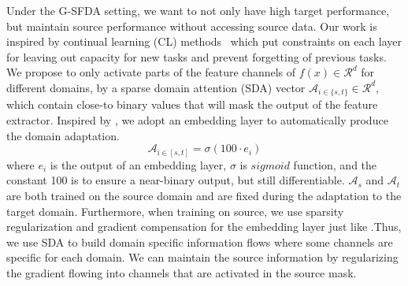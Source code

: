 \documentclass[10pt,twocolumn,letterpaper]{article}
\begin{document}
Under the G-SFDA setting, we want to not only have high target performance, but maintain source performance without accessing source data.  Our work is inspired by continual learning (CL) methods~\cite{abati2020conditional,mallya2018packnet,serra2018overcoming} which put constraints on each layer for leaving out capacity for new tasks and prevent forgetting of previous tasks.
We propose to only activate parts of the feature channels of $f(x)\in \mathcal{R}^d$ for different domains, by a sparse domain attention (SDA) vector $\mathcal{A}_{i\in\{s,t\}} \in \mathcal{R}^d$, which contain close-to binary values that will mask the output of the feature extractor. Inspired by \cite{serra2018overcoming}, we adopt an embedding layer to automatically produce the domain adaptation.
\begin{equation}\label{eq:dal}
\mathcal{A}_{\mathrm{i}\in [s, t]}= \sigma (100 \cdot e_i)
\end{equation}
where $e_i$ is the output of an embedding layer, $\sigma $ is $sigmoid$ function, and the constant 100 is to ensure a near-binary output, but still differentiable. 
$\mathcal{A}_s$ and $\mathcal{A}_t$ are both trained on the source domain and are fixed during the adaptation to the target domain. Furthermore, when training on source, we use sparsity regularization and gradient compensation for the embedding layer just like \cite{serra2018overcoming}.Thus, we use SDA to build domain specific information flows where some channels are specific for each domain. We can maintain the source information by regularizing the gradient flowing into channels that are activated in the source mask. 
\end{document}
